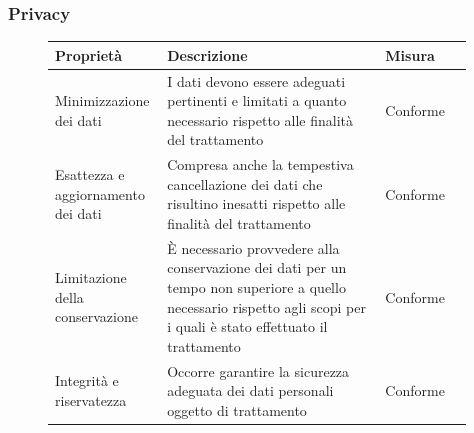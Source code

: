 \documentclass{article}
\begin{document}
\subsubsection{Privacy}\label{rnf_1}
\begin{description}
	\item[]
	    
	
	
	\begin{table}[!htbp]
		\begin{tabular} {|>{\raggedright\arraybackslash}m{0.20\linewidth} | >{\raggedright\arraybackslash}m{0.50\linewidth}|>{\raggedright\arraybackslash}m{0.20\linewidth}|}
			\hline
			\textbf{Proprietà}                & \textbf{Descrizione}                                                                                               & \textbf{Misura} \\ \hline
			Minimizzazione dei dati            & I dati devono essere adeguati pertinenti e limitati a quanto necessario rispetto alle finalità del trattamento    & Conforme        \\ \hline
			Esattezza e aggiornamento dei dati & Compresa anche la tempestiva cancellazione dei dati che risultino inesatti rispetto alle finalità del trattamento & Conforme        \\ \hline
			Limitazione della conservazione &
			È necessario provvedere alla conservazione dei dati per un tempo non superiore a quello necessario rispetto agli scopi per i quali è stato effettuato il trattamento &
			Conforme \\ \hline
			Integrità e riservatezza          & Occorre garantire la sicurezza adeguata dei dati personali oggetto di trattamento                                  & Conforme        \\ \hline
		\end{tabular}
	\end{table}
	
	    
\end{description}
\end{document}
